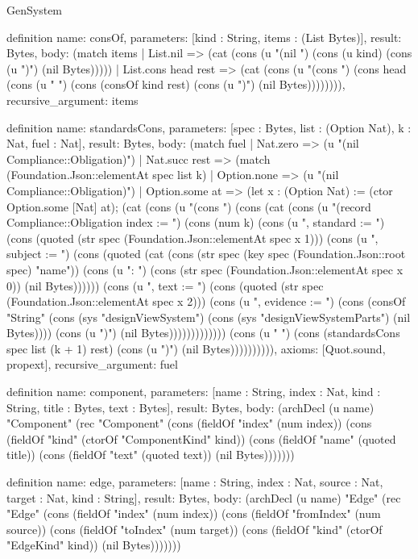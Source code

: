 \begin{lexlean}{GenSystem}
\begin{semanticmodule}
{definition{
  name: consOf,
  parameters: [kind : String, items : (List Bytes)],
  result: Bytes,
  body: (match items
    | List.nil => (cat (cons (u "(nil ") (cons (u kind) (cons (u ")") (nil Bytes)))))
    | List.cons head rest => (cat (cons (u "(cons ") (cons head (cons (u " ") (cons (consOf kind rest) (cons (u ")") (nil Bytes)))))))),
  recursive_argument: items
}

definition{
  name: standardsCons,
  parameters: [spec : Bytes, list : (Option Nat), k : Nat, fuel : Nat],
  result: Bytes,
  body: (match fuel
    | Nat.zero => (u "(nil Compliance::Obligation)")
    | Nat.succ rest => (match (Foundation.Json::elementAt spec list k)
      | Option.none => (u "(nil Compliance::Obligation)")
      | Option.some at => (let x : (Option Nat) := (ctor Option.some [Nat] at); (cat (cons (u "(cons ") (cons (cat (cons (u "(record Compliance::Obligation {index := ") (cons (num k) (cons (u ", standard := ") (cons (quoted (str spec (Foundation.Json::elementAt spec x 1))) (cons (u ", subject := ") (cons (quoted (cat (cons (str spec (key spec (Foundation.Json::root spec) "name")) (cons (u ": ") (cons (str spec (Foundation.Json::elementAt spec x 0)) (nil Bytes)))))) (cons (u ", text := ") (cons (quoted (str spec (Foundation.Json::elementAt spec x 2))) (cons (u ", evidence := ") (cons (consOf "String" (cons (sys "designViewSystem") (cons (sys "designViewSystemParts") (nil Bytes)))) (cons (u "})") (nil Bytes))))))))))))) (cons (u " ") (cons (standardsCons spec list (k + 1) rest) (cons (u ")") (nil Bytes)))))))))),
  axioms: [Quot.sound, propext],
  recursive_argument: fuel
}

definition{
  name: component,
  parameters: [name : String, index : Nat, kind : String, title : Bytes, text : Bytes],
  result: Bytes,
  body: (archDecl (u name) "Component" (rec "Component" (cons (fieldOf "index" (num index)) (cons (fieldOf "kind" (ctorOf "ComponentKind" kind)) (cons (fieldOf "name" (quoted title)) (cons (fieldOf "text" (quoted text)) (nil Bytes)))))))
}

definition{
  name: edge,
  parameters: [name : String, index : Nat, source : Nat, target : Nat, kind : String],
  result: Bytes,
  body: (archDecl (u name) "Edge" (rec "Edge" (cons (fieldOf "index" (num index)) (cons (fieldOf "fromIndex" (num source)) (cons (fieldOf "toIndex" (num target)) (cons (fieldOf "kind" (ctorOf "EdgeKind" kind)) (nil Bytes)))))))
}

}
\end{semanticmodule}
\end{lexlean}
